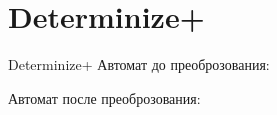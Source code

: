 \section{Determinize+}
\begin{frame}{Determinize+}
	Автомат до преоброзования:


	Автомат после преоброзования:


\end{frame}
